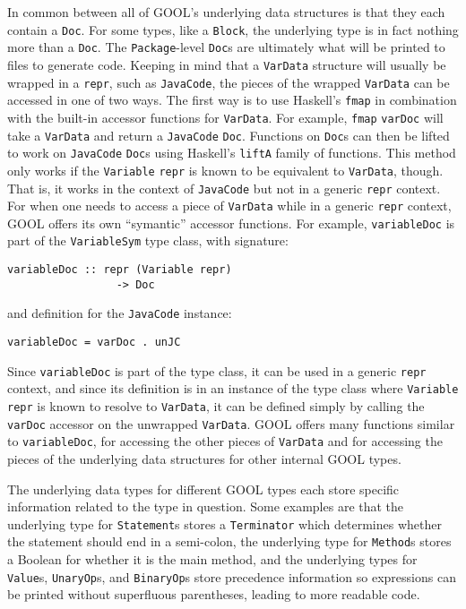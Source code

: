 \documentclass[sigplan,review,anonymous,prologue,dvipsnames]{acmart}
\begin{document}
In common between all of GOOL's underlying data structures is that they each 
contain a \verb|Doc|. For some types, like a \verb|Block|, the underlying type 
is in fact nothing more than a \verb|Doc|. The \verb|Package|-level \verb|Doc|s 
are ultimately what will be printed to files to generate code. Keeping in mind 
that a \verb|VarData| structure will usually be wrapped in a \verb|repr|, such 
as \verb|JavaCode|, the pieces of the wrapped \verb|VarData| can be accessed in 
one of two ways. The first way is to use Haskell's \verb|fmap| in combination 
with the built-in accessor functions for \verb|VarData|. For example, 
\verb|fmap| \verb|varDoc| will take a \verb|VarData| and return a 
\verb|JavaCode| \verb|Doc|. Functions on \verb|Doc|s can then be lifted to work 
on \verb|JavaCode| \verb|Doc|s using Haskell's \verb|liftA| family of 
functions. This method only works if the \verb|Variable| \verb|repr| is known 
to be equivalent to \verb|VarData|, though. That is, it works in the context of 
\verb|JavaCode| but not in a generic \verb|repr| context. For when one needs to 
access a piece of \verb|VarData| while in a generic \verb|repr| context, GOOL 
offers its own ``symantic'' accessor functions. For example, \verb|variableDoc| 
is part of the \verb|VariableSym| type class, with signature:
\begin{lstlisting}
variableDoc :: repr (Variable repr) 
                 -> Doc
\end{lstlisting}
and definition for the \verb|JavaCode| instance:
\begin{lstlisting}
variableDoc = varDoc . unJC
\end{lstlisting}
Since \verb|variableDoc| is part of the type class, it can be used in a generic 
\verb|repr| context, and since its definition is in an instance of the type 
class where \verb|Variable| \verb|repr| is known to resolve to \verb|VarData|, 
it can be defined simply by calling the \verb|varDoc| accessor on the unwrapped 
\verb|VarData|. GOOL offers many functions similar to \verb|variableDoc|, for 
accessing the other pieces of \verb|VarData| and for accessing the pieces of 
the underlying data structures for other internal GOOL types.

The underlying data types for different GOOL types each store specific 
information related to the type in question. Some examples are that the 
underlying type for \verb|Statement|s stores a \verb|Terminator| which 
determines whether the statement should end in a semi-colon, the underlying 
type for \verb|Method|s stores a Boolean for whether it is the main method, and 
the underlying types for \verb|Value|s, \verb|UnaryOp|s, and \verb|BinaryOp|s 
store precedence information so expressions can be printed without superfluous 
parentheses, leading to more readable code.
\end{document}
